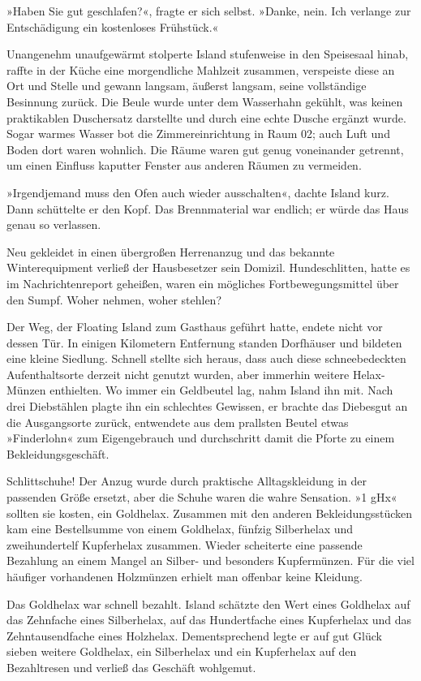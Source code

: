 »Haben Sie gut geschlafen?«, fragte er sich selbst. »Danke, nein. Ich verlange zur Entschädigung ein kostenloses Frühstück.«

Unangenehm unaufgewärmt stolperte Island stufenweise in den Speisesaal hinab, raffte in der Küche eine morgendliche Mahlzeit zusammen, verspeiste diese an Ort und Stelle und gewann langsam, äußerst langsam, seine vollständige Besinnung zurück. Die Beule wurde unter dem Wasserhahn gekühlt, was keinen praktikablen Duschersatz darstellte und durch eine echte Dusche ergänzt wurde. Sogar warmes Wasser bot die Zimmereinrichtung in Raum 02; auch Luft und Boden dort waren wohnlich. Die Räume waren gut genug voneinander getrennt, um einen Einfluss kaputter Fenster aus anderen Räumen zu vermeiden.

»Irgendjemand muss den Ofen auch wieder ausschalten«, dachte Island kurz. Dann schüttelte er den Kopf. Das Brennmaterial war endlich; er würde das Haus genau so verlassen.

Neu gekleidet in einen übergroßen Herrenanzug und das bekannte Winterequipment verließ der Hausbesetzer sein Domizil. Hundeschlitten, hatte es im Nachrichtenreport geheißen, waren ein mögliches Fortbewegungsmittel über den Sumpf. Woher nehmen, woher stehlen?

Der Weg, der Floating Island zum Gasthaus geführt hatte, endete nicht vor dessen Tür. In einigen Kilometern Entfernung standen Dorfhäuser und bildeten eine kleine Siedlung. Schnell stellte sich heraus, dass auch diese schneebedeckten Aufenthaltsorte derzeit nicht genutzt wurden, aber immerhin weitere Helax-Münzen enthielten. Wo immer ein Geldbeutel lag, nahm Island ihn mit. Nach drei Diebstählen plagte ihn ein schlechtes Gewissen, er brachte das Diebesgut an die Ausgangsorte zurück, entwendete aus dem prallsten Beutel etwas »Finderlohn« zum Eigengebrauch und durchschritt damit die Pforte zu einem Bekleidungsgeschäft.

Schlittschuhe! Der Anzug wurde durch praktische Alltagskleidung in der passenden Größe ersetzt, aber die Schuhe waren die wahre Sensation. »1 gHx« sollten sie kosten, ein Goldhelax. Zusammen mit den anderen Bekleidungsstücken kam eine Bestellsumme von einem Goldhelax, fünfzig Silberhelax und zweihundertelf Kupferhelax zusammen. Wieder scheiterte eine passende Bezahlung an einem Mangel an Silber- und besonders Kupfermünzen. Für die viel häufiger vorhandenen Holzmünzen erhielt man offenbar keine Kleidung.

Das Goldhelax war schnell bezahlt. Island schätzte den Wert eines Goldhelax auf das Zehnfache eines Silberhelax, auf das Hundertfache eines Kupferhelax und das Zehntausendfache eines Holzhelax. Dementsprechend legte er auf gut Glück sieben weitere Goldhelax, ein Silberhelax und ein Kupferhelax auf den Bezahltresen und verließ das Geschäft wohlgemut.

